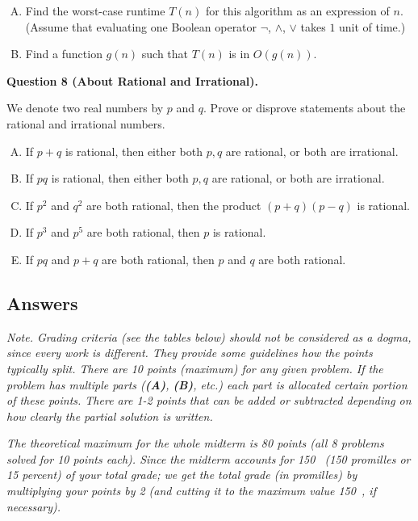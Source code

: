 \documentclass[jou]{apa6}
\begin{document}
\begin{enumerate}[(A)]
\item Find the worst-case runtime $T(n)$ for this algorithm as an expression of $n$.
(Assume that evaluating one Boolean operator $\neg$, $\wedge$, $\vee$ takes $1$ unit of time.)
\item Find a function $g(n)$ such that $T(n)$ is in $O(g(n))$. 
\end{enumerate}




\vspace{10pt}
{\bf Question 8 (About Rational and Irrational).}

We denote two real numbers by $p$ and $q$. 
Prove or disprove statements about the rational and irrational numbers. 

\begin{enumerate}[(A)]
\item If $p + q$ is rational, then either both $p,q$ are rational, or both are irrational. 
\item If $pq$ is rational, then either both $p,q$ are rational, or both are irrational. 
\item If $p^2$ and $q^2$ are both rational, then the product $(p+q)(p-q)$ is rational. 
\item If $p^3$ and $p^5$ are both rational, then $p$ is rational.
\item If $pq$ and $p+q$ are both rational, then $p$ and $q$ are both rational.
\end{enumerate}

\newpage

\subsection{Answers}

{\em Note. Grading criteria (see the tables below) should not be considered as a dogma, 
since every work is different. They provide some guidelines how the points typically split. 
There are 10 points (maximum) for any given problem. If the problem has multiple parts
({\bf (A)}, {\bf (B)}, etc.) each part is allocated certain portion of these points. 
There are 1-2 points that can be added or subtracted depending on how clearly the 
partial solution is written.}

{\em
The theoretical maximum for the whole midterm is 80 points (all 8 problems solved for 10 points each).
Since the midterm accounts for 150~\textperthousand{} (150 promilles or 15 percent) of your
total grade; we get the total grade (in promilles) by multiplying your points by 2
(and cutting it to the maximum value 150~\textperthousand{}, if necessary). 
}
\end{document}
